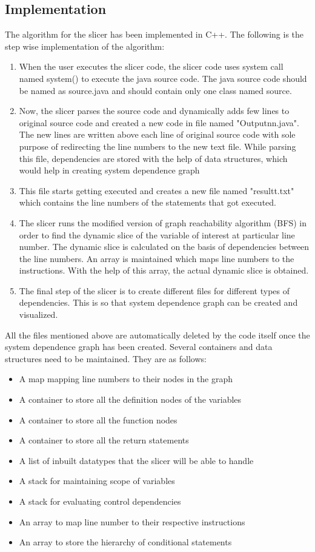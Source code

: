 \documentclass[conference]{IEEEtran}
\begin{document}
\subsection{Implementation}
The algorithm for the slicer has been implemented in C++. The following is the step wise implementation of the algorithm:
\begin{enumerate}
    \item When the user executes the slicer code, the slicer code uses system call named system() to execute the java source code. The java source code should be named as source.java and should contain only one class named source. 
    \item Now, the slicer parses the source code and dynamically adds few lines to original source code and created a new code in file named "Outputnn.java". The new lines are written above each line of original source code with sole purpose of redirecting the line numbers to the new text file. While parsing this file, dependencies are stored with the help of data structures, which would help in creating system dependence graph
    \item This file starts getting executed and creates a new file named "resultt.txt" which contains the line numbers of the statements that got executed.
    \item The slicer runs the modified version of graph reachability algorithm (BFS) in order to find the dynamic slice of the variable of interest at particular line number. The dynamic slice is calculated on the basis of dependencies between the line numbers. An array is maintained which maps line numbers to the instructions. With the help of this array, the actual dynamic slice is obtained.
    \item The final step of the slicer is to create different files for different types of dependencies. This is so that system dependence graph can be created and visualized. 
\end{enumerate}
All the files mentioned above are automatically deleted by the code itself once the system dependence graph has been created. Several containers and data structures need to be maintained. They are as follows:
\begin{itemize}
    \item A map mapping line numbers to their nodes in the graph
    \item A container to store all the definition nodes of the variables
    \item A container to store all the function nodes
    \item A container to store all the return statements
    \item A list of inbuilt datatypes that the slicer will be able to handle
    \item A stack for maintaining scope of variables
    \item A stack for evaluating control dependencies
    \item An array to map line number to their respective instructions
    \item An array to store the hierarchy of conditional statements
\end{itemize}
\end{document}
